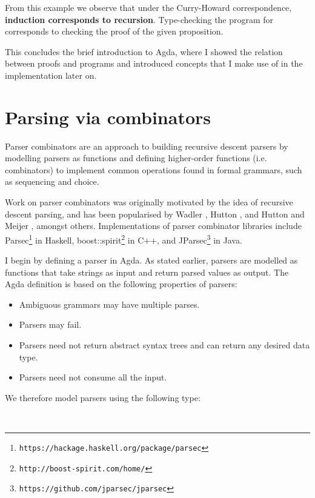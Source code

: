 \documentclass[12pt,a4paper,twoside,openright]{report}
\newcommand{\F}{\AgdaFunction}
\begin{document}
From this example we observe that under the Curry-Howard correspondence, {\bf induction corresponds to recursion}. Type-checking the program for \F{++-assoc} corresponds to checking the proof of the given proposition. 

This concludes the brief introduction to Agda, where I showed the relation between proofs and programs and introduced concepts that I make use of in the implementation later on.

\section{Parsing via combinators} \label{parse}

Parser combinators are an approach to building recursive descent parsers by modelling parsers as functions and defining higher-order functions (i.e. combinators) to implement common operations found in formal grammars, such as sequencing and choice.

Work on parser combinators was originally motivated by the idea of recursive descent parsing, and has been popularised by Wadler \cite{wadler-parse}, Hutton \cite{hutton-parse}, and Hutton and Meijer \cite{hm-parse}, amongst others. Implementations of parser combinator libraries include Parsec\footnote{\tt https://hackage.haskell.org/package/parsec} in Haskell, boost::spirit\footnote{\tt http://boost-spirit.com/home/} in C++, and JParsec\footnote{\tt https://github.com/jparsec/jparsec} in Java.

I begin by defining a parser in Agda. As stated earlier, parsers are modelled as functions that take strings as input and return parsed values as output. The Agda definition is based on the following properties of parsers:
\begin{itemize}
\item Ambiguous grammars may have multiple parses.
\item {Parsers may fail.}
\item {Parsers need not return abstract syntax trees and can return any desired data type.}
\item Parsers need not consume all the input.
\end{itemize}

We therefore model parsers using the following type:

\begin{code}
\>  \AgdaSymbol{(} \AgdaSymbol{:} \AgdaSymbol{)} \AgdaSymbol{:}  \<%
\\
\>[0]\<[2]%
\>[2] \AgdaSymbol{:} \AgdaSymbol{(}   \AgdaSymbol{(}  \AgdaSymbol{))}   \<%
\end{code}
\end{document}
